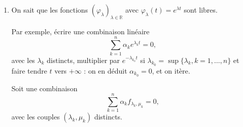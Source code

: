 \begin{enumerate}[label=\arabic*.,leftmargin=2.2em,itemsep=1.1em]
On a $T_{i,j}(e_i)=e_j$, $T_{i,j}(e_j)=e_i$ et $\forall k\ne i,\ne j$, $T_{i,j}(e_k)=e_k$. Donc
\[
T_{i,j}(e_i+e_j)=e_i+e_j
\qquad\text{et}\qquad
T_{i,j}(e_i-e_j)=e_j-e_i.
\]
$T_{i,j}$ est diagonalisable avec

$-1$ valeur propre simple, et sous-espace propre associé $\mathbb R(e_i-e_j)$,

$1$ valeur propre d'ordre $n-1$, et sous-espace propre associé $\operatorname{Vect}((e_i+e_j),e_k,k\ne i,k\ne j)$.

Si $F$ est un sous-espace stable par chaque $T_\sigma$, donc par chaque $T_{i,j}$, chaque $T_{i,j}$ induit sur $F$ un endomorphisme diagonalisable, de valeurs propres possibles 1 et $-1$ et si $-1$ est valeur propre, c'est que $e_i-e_j\in F$ pour au moins un couple $(i,j)$ avec $i\ne j$.

\emph{1er cas} Il existe un couple $(i,j)$, $i\ne j$ tel que $e_i-e_j\in F$, alors pour tout $k\notin\{i,j\}$,
\[
T_{j,k}(e_i-e_j)=e_i-e_k\in F.
\]
Les $n-1$ vecteurs $e_i-e_r$, $r\ne i$ engendrent l'hyperplan $H$ d'équation
\[
x_1+\cdots+x_n=0,
\]
on a $H\subset F$ d'où en fait $F=E$ ou $F=H$ qui est bien stable, car $x_{\sigma(1)}+\cdots+x_{\sigma(n)}=0$.

\emph{2e cas} $F$ ne contient aucun $e_i-e_j$. Avec $F$ stable pour tout $T_\sigma$, c'est que $F$ est sous-espace de chaque hyperplan
\[
H_{ij}=\operatorname{Vect}(e_i+e_j,e_k,k\ne i,k\ne j).
\]
En munissant $\mathbb R^n$ de sa structure euclidienne canonique, on constate que
\[
H_{ij}=(e_i-e_j)^\perp,
\]
c'est l'hyperplan d'équation $x_i-x_j=0$.

Donc dans ce cas les $x=(x_1,\ldots,x_n)$ de $F$ sont tels que $\forall i\ne j$, $x_i=x_j$ : on a
\[
F\subset\operatorname{Vect}(1,1,\ldots,1).
\]
Cette droite vectorielle est bien stable par $T_\sigma$ d'où dans ce cas $F=\operatorname{Vect}(1,\ldots,1)$, ou $F=\{0\}$.

\item On sait que les fonctions $(\varphi_\lambda)_{\lambda\in\mathbb R}$ avec $\varphi_\lambda(t)=e^{\lambda t}$ sont libres.

Par exemple, écrire une combinaison linéaire
\[
\sum_{k=1}^n\alpha_ke^{\lambda_k t}=0,
\]
avec les $\lambda_k$ distincts, multiplier par $e^{-\lambda_{k_0}t}$ si $\lambda_{k_0}=\sup\{\lambda_k,k=1,\ldots,n\}$ et faire tendre $t$ vers $+\infty$ : on en déduit $\alpha_{k_0}=0$, et on itère.

Soit une combinaison
\[
\sum_{k=1}^n\alpha_k f_{\lambda_k,\mu_k}=0,
\]
avec les couples $(\lambda_k,\mu_k)$ distincts.


\end{enumerate}
